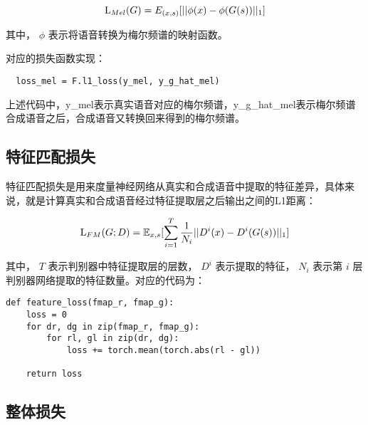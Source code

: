 \documentclass[cn,10pt,math=newtx,citestyle=gb7714-2015,bibstyle=gb7714-2015]{elegantbook}
\begin{document}
\begin{equation}
  {\rm L}_{Mel}(G)=E_{(x,s)}[||\phi(x)-\phi(G(s))||_1]
\end{equation}

其中， $\phi$ 表示将语音转换为梅尔频谱的映射函数。

对应的损失函数实现：

\begin{lstlisting}
  loss_mel = F.l1_loss(y_mel, y_g_hat_mel)
\end{lstlisting}

上述代码中，y\_mel表示真实语音对应的梅尔频谱，y\_g\_hat\_mel表示梅尔频谱合成语音之后，合成语音又转换回来得到的梅尔频谱。

\subsection{特征匹配损失}

特征匹配损失是用来度量神经网络从真实和合成语音中提取的特征差异，具体来说，就是计算真实和合成语音经过特征提取层之后输出之间的L1距离：

\begin{equation}
  {\rm L}_{FM}(G;D)=\mathbb{E}_{x,s}[\sum_{i=1}^T\frac{1}{N_i}||D^i(x)-D^i(G(s))||_1]
\end{equation}

其中， $T$ 表示判别器中特征提取层的层数， $D^i$ 表示提取的特征， $N_i$ 表示第 $i$ 层判别器网络提取的特征数量。对应的代码为：

\begin{lstlisting}
def feature_loss(fmap_r, fmap_g):
    loss = 0
    for dr, dg in zip(fmap_r, fmap_g):
        for rl, gl in zip(dr, dg):
            loss += torch.mean(torch.abs(rl - gl))

    return loss
\end{lstlisting}

\subsection{整体损失}
\end{document}

